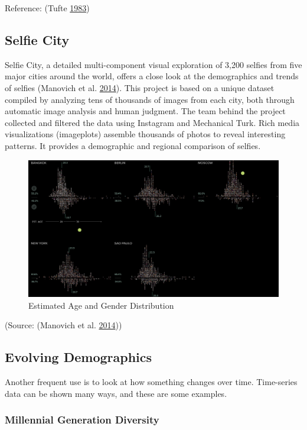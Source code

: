 \documentclass[]{book}
\theoremstyle{definition}
\theoremstyle{definition}
\theoremstyle{definition}
\theoremstyle{remark}
\begin{document}
Reference: (Tufte \protect\hyperlink{ref-visual_display}{1983})

\subsection{Selfie City}\label{selfie-city}

Selfie City, a detailed multi-component visual exploration of 3,200
selfies from five major cities around the world, offers a close look at
the demographics and trends of selfies (Manovich et al.
\protect\hyperlink{ref-selfie}{2014}). This project is based on a unique
dataset compiled by analyzing tens of thousands of images from each
city, both through automatic image analysis and human judgment. The team
behind the project collected and filtered the data using Instagram and
Mechanical Turk. Rich media visualizations (imageplots) assemble
thousands of photos to reveal interesting patterns. It provides a
demographic and regional comparison of selfies.

\begin{figure}
\centering
\includegraphics{images/selfie_age_gender.png}
\caption{Estimated Age and Gender Distribution}
\end{figure}

(Source: (Manovich et al. \protect\hyperlink{ref-selfie}{2014}))

\subsection{Evolving Demographics}\label{evolving-demographics}

Another frequent use is to look at how something changes over time.
Time-series data can be shown many ways, and these are some examples.

\subsubsection{Millennial Generation
Diversity}\label{millennial-generation-diversity}
\end{document}
